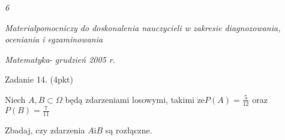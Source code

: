 \documentclass[a4paper,12pt]{article}
\begin{document}
{\it 6}

{\it Materialpomocniczy do doskonalenia nauczycieli w zakresie diagnozowania, oceniania i egzaminowania}

{\it Matematyka}- {\it grudzień 2005 r}.

Zadanie 14. (4pkt)

Niech $A, B \subset \Omega$ będą zdarzeniami losowymi, takimi $\displaystyle \dot{\mathrm{z}}\mathrm{e}P(A)=\frac{5}{12}$ oraz $P(B)=\displaystyle \frac{7}{11}$

Zbadaj, czy zdarzenia $A\mathrm{i}B$ są rozłączne.
\end{document}
